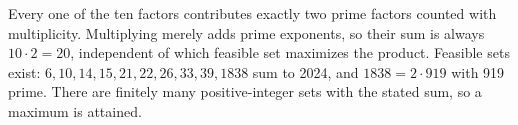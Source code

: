 Every one of the ten factors contributes exactly two prime factors counted with multiplicity. Multiplying merely adds prime exponents, so their sum is always $10\cdot2=\boxed{20}$, independent of which feasible set maximizes the product. Feasible sets exist: $6,10,14,15,21,22,26,33,39,1838$ sum to 2024, and $1838=2\cdot919$ with 919 prime. There are finitely many positive-integer sets with the stated sum, so a maximum is attained.
